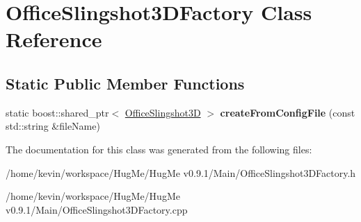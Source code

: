 \hypertarget{classOfficeSlingshot3DFactory}{
\section{OfficeSlingshot3DFactory Class Reference}
\label{classOfficeSlingshot3DFactory}
}
\subsection*{Static Public Member Functions}
\begin{DoxyCompactItemize}
\item 
\hypertarget{classOfficeSlingshot3DFactory_ae282fe62015e22275188d157d9fa5fcb}{
static boost::shared\_\-ptr$<$ \hyperlink{classOfficeSlingshot3D}{OfficeSlingshot3D} $>$ {\bfseries createFromConfigFile} (const std::string \&fileName)}
\label{classOfficeSlingshot3DFactory_ae282fe62015e22275188d157d9fa5fcb}

\end{DoxyCompactItemize}


The documentation for this class was generated from the following files:\begin{DoxyCompactItemize}
\item 
/home/kevin/workspace/HugMe/HugMe v0.9.1/Main/OfficeSlingshot3DFactory.h\item 
/home/kevin/workspace/HugMe/HugMe v0.9.1/Main/OfficeSlingshot3DFactory.cpp\end{DoxyCompactItemize}
